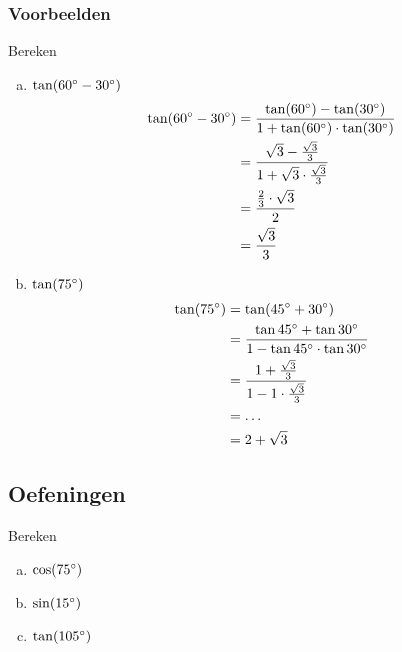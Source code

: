 \documentclass[twoside,a4paper,12pt]{article}
\begin{document}
\subsubsection*{Voorbeelden}
Bereken
\begin{enumerate}[(a)]
  \item $\tan(60^\circ - 30^\circ)$
  \vspace*{-0.5cm}
  \begin{align*}
    \tan(60^\circ - 30^\circ)&=\dfrac{\tan(60^\circ)-\tan(30^\circ)}{1+\tan(60^\circ)\cdot\tan(30^\circ)}\\
                               &=\dfrac{\sqrt{3}-\frac{\sqrt{3}}{3}}{1+\sqrt{3}\cdot\frac{\sqrt{3}}{3}}\\
                               &=\dfrac{\frac{2}{3}\cdot\sqrt{3}}{2}\\
                               &=\dfrac{\sqrt{3}}{3}
  \end{align*}
  \item $\tan(75^\circ)$
  \vspace*{-0.5cm}
  \begin{align*}
    \tan(75^\circ) &= \tan(45^\circ + 30^\circ)\\
                    &= \dfrac{\tan45^\circ+\tan30^\circ}{1-\tan45^\circ\cdot\tan30^\circ}\\
                    &= \dfrac{1+\frac{\sqrt{3}}{3}}{1-1\cdot\frac{\sqrt{3}}{3}}\\
                    &= \ldots\\
                    &= 2+\sqrt{3}
  \end{align*}
\end{enumerate}

\subsection{Oefeningen}

\begin{oefening}
Bereken
\begin{multicols}{3}
\begin{enumerate}[(a)]
  \itemsep.5em
  \item $\cos(75^\circ)$
  \item $\sin(15^\circ)$
  \item $\tan(105^\circ)$
\end{enumerate}
\end{multicols}
\end{oefening}
\end{document}
